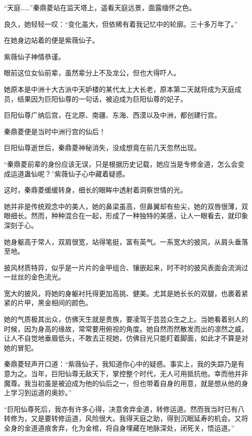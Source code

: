
\begin{this_body}

“天庭……”秦鼎菱站在监天塔上，遥看天庭远景，面露缅怀之色。

良久，她轻轻一叹：“变化虽大，但依稀有着我记忆中的轮廓。三十多万年了。”

在她身边站着的便是紫薇仙子。

紫薇仙子神情恭谨。

眼前这位女仙前辈，虽然辈分上不及龙公，但也大得吓人。

她原本是中洲十大古派中天妒楼的某代太上大长老，原本第二天就将成为天庭成员，结果因为巨阳仙尊的一句话，被迫成为巨阳仙尊的妃子。

巨阳仙尊广纳后宫，在北原、南疆、东海、西漠以及中洲，都创建行宫。

秦鼎菱便是当时中洲行宫的仙后！

巨阳仙尊逝世后，秦鼎菱神秘消失，没成想竟在前几天忽然出现。

“秦鼎菱前辈的身份应该无误，只是根据历史记载，她应当是专修金道，怎么会变成运道蛊仙呢？”紫薇仙子心中藏着疑惑。

这时，秦鼎菱缓缓转身，细长的眼眸中透射着洞察世情的光。

她并非是传统观念中的美人，她的鼻梁虽高，但鼻翼却有些尖，她的双唇很薄，双眼细长。然而，种种混合在一起，形成了一种独特的美感，让人一眼看去，就印象深刻于心。

她身躯高于常人，双肩很宽，站得笔挺，富有英气。一系宽大的披风，从肩头垂落至地。

披风材质特异，似乎是一片片的金甲组合、镶嵌起来，时不时的披风表面会流淌过一丝丝的金色流光。

宽大的披风，将她的身躯衬托得更加高挑、健美。尤其是她长长的双腿，也裹着紧紧的片甲，黑金相间的颜色。

她的气质极其出众，仿佛天生就是贵族，要凌驾于芸芸众生之上。当她看着别人的时候，因为身高的缘故，常常要用俯视的角度。她自然而然散发而出的凛然之威，让人不自觉地垂眉低头，不敢去正视她，仿佛目光只能盯着脚面，如此才不算是对她的冒犯。

秦鼎菱轻声开口道：“紫薇仙子，我知道你心中的疑惑。事实上，我的失踪乃是有意为之。当年，巨阳仙尊无敌天下，掌控整个时代，无人可用抵抗他。幸而他并非魔尊。我当初虽是被迫成为他的仙后之一，但也带着自身的用意，就是想从他的身上学习到运道的奥妙。”

“巨阳仙尊死后，我亦有许多心得，决意舍弃金道，转修运道。然而我当时已有八转修为，又是要转修运道，风险很大。我得天庭之助，得到沉眠延寿的机会。又将全身的金道道痕舍弃，化为金棺，将自身埋藏在地脉深处，闭死关，悟运道。”


\end{this_body}
